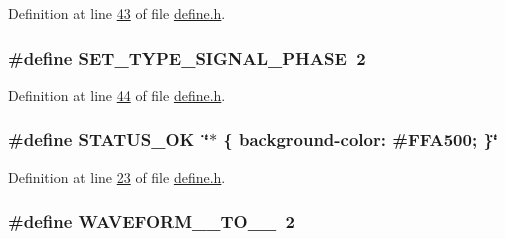 Definition at line \hyperlink{a00034_source_l00043}{43} of file \hyperlink{a00034_source}{define.\+h}.

\hypertarget{a00034_a45f9851d4938b1ce68a1aad58d8776cc}{
\subsubsection[{S\+E\+T\+\_\+\+T\+Y\+P\+E\+\_\+\+S\+I\+G\+N\+A\+L\+\_\+\+P\+H\+A\+S\+E}]{\setlength{\rightskip}{0pt plus 5cm}\#define S\+E\+T\+\_\+\+T\+Y\+P\+E\+\_\+\+S\+I\+G\+N\+A\+L\+\_\+\+P\+H\+A\+S\+E~2}}\label{a00034_a45f9851d4938b1ce68a1aad58d8776cc}


Definition at line \hyperlink{a00034_source_l00044}{44} of file \hyperlink{a00034_source}{define.\+h}.

\hypertarget{a00034_a2403320c41f08e7567cb169de5db66b3}{
\subsubsection[{S\+T\+A\+T\+U\+S\+\_\+\+O\+K}]{\setlength{\rightskip}{0pt plus 5cm}\#define S\+T\+A\+T\+U\+S\+\_\+\+O\+K~\char`\"{}$\ast$ \{ background-\/color\+: \#F\+F\+A500; \}\char`\"{}}}\label{a00034_a2403320c41f08e7567cb169de5db66b3}


Definition at line \hyperlink{a00034_source_l00023}{23} of file \hyperlink{a00034_source}{define.\+h}.

\hypertarget{a00034_ae18fed2471b16a8516d721ff60671dd9}{
\subsubsection[{W\+A\+V\+E\+F\+O\+R\+M\+\_\+0\+\_\+\+T\+O\+\_\+3\+\_\+3}]{\setlength{\rightskip}{0pt plus 5cm}\#define W\+A\+V\+E\+F\+O\+R\+M\+\_\+\_\+\+T\+O\+\_\+\_~2}}\label{a00034_ae18fed2471b16a8516d721ff60671dd9}


